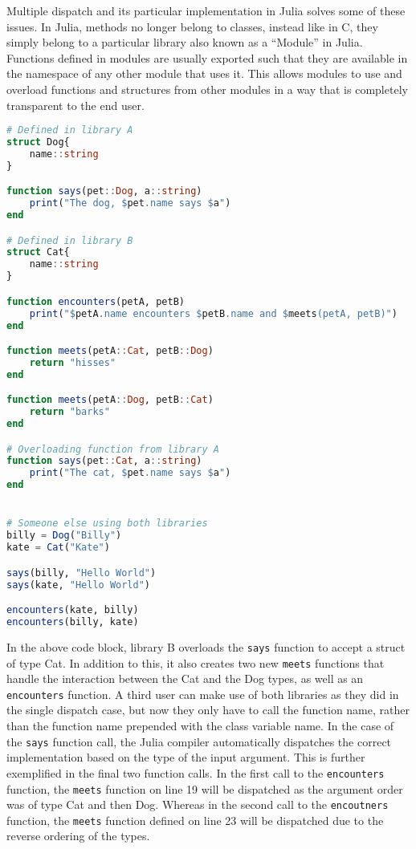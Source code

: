 Multiple dispatch and its particular implementation in Julia solves some of these issues. In Julia, methods no longer belong to
classes, instead like in C, they simply belong to a particular library also known as a ``Module'' in Julia. Functions
defined in modules are usually exported such that they are available in the namespace of any other module that uses it.
This allows modules to use and overload functions and structures from other modules in a way that is completely
transparent to the end user.   
\begin{lstlisting}[language=Julia]
# Defined in library A
struct Dog{
    name::string
}

function says(pet::Dog, a::string)
    print("The dog, $pet.name says $a")
end  

# Defined in library B 
struct Cat{
    name::string
}

function encounters(petA, petB)
    print("$petA.name encounters $petB.name and $meets(petA, petB)")
end

function meets(petA::Cat, petB::Dog)
    return "hisses"
end

function meets(petA::Dog, petB::Cat)
    return "barks"
end

# Overloading function from library A
function says(pet::Cat, a::string)
    print("The cat, $pet.name says $a")
end


# Someone else using both libraries
billy = Dog("Billy")
kate = Cat("Kate")

says(billy, "Hello World")
says(kate, "Hello World")

encounters(kate, billy)
encounters(billy, kate)
\end{lstlisting}
In the above code block, library B overloads the \lstinline[language=Julia]{says} function to accept a struct of type
Cat. In addition to this, it also creates two new \lstinline[language=Julia]{meets} functions that handle the
interaction between the Cat and the Dog types, as well as an \lstinline[language=Julia]{encounters} function. A third
user can make use of both libraries as they did in the single dispatch case, but now they only have to call the function
name, rather than the function name prepended with the class variable name. In the case of the
\lstinline[language=Julia]{says} function call, the Julia compiler automatically dispatches the correct implementation
based on the type of the input argument. This is further exemplified in the final two function calls. In the first call
to the \lstinline[language=Julia]{encounters} function, the \lstinline[language=Julia]{meets} function on line 19 will
be dispatched as the argument order was of type Cat and then Dog. Whereas in the second call to the
\lstinline[language=Julia]{encoutners} function, the \lstinline[language=Julia]{meets} function defined on line 23 will
be dispatched due to the reverse ordering of the types.

